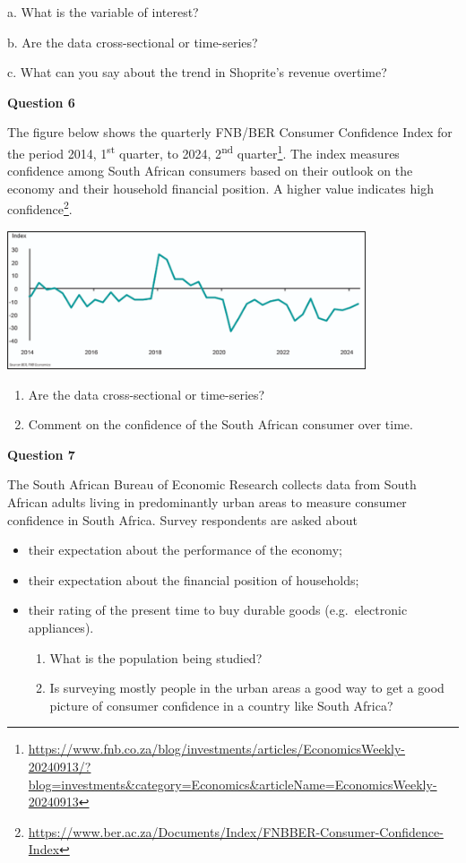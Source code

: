 \documentclass[
]{book}
\begin{document}
a. What is the variable of interest?

b. Are the data cross-sectional or time-series?

c. What can you say about the trend in Shoprite's revenue overtime?

\textbf{Question 6}

The figure below shows the quarterly FNB/BER Consumer Confidence Index for the period 2014, 1\textsuperscript{st} quarter, to 2024, 2\textsuperscript{nd} quarter\footnote{\url{https://www.fnb.co.za/blog/investments/articles/EconomicsWeekly-20240913/?blog=investments&category=Economics&articleName=EconomicsWeekly-20240913}}. The index measures confidence among South African consumers based on their outlook on the economy and their household financial position. A higher value indicates high confidence\footnote{\url{https://www.ber.ac.za/Documents/Index/FNBBER-Consumer-Confidence-Index}}.

\includegraphics[width=4.16667in,height=\textheight]{images/clipboard-2186963206.png}

\begin{enumerate}
\def\labelenumi{\alph{enumi}.}
\item
  Are the data cross-sectional or time-series?
\item
  Comment on the confidence of the South African consumer over time.
\end{enumerate}

\hfill\break
\textbf{Question 7}

The South African Bureau of Economic Research collects data from South African adults living in predominantly urban areas to measure consumer confidence in South Africa. Survey respondents are asked about

\begin{itemize}
\item
  their expectation about the performance of the economy;
\item
  their expectation about the financial position of households;
\item
  their rating of the present time to buy durable goods (e.g.~electronic appliances).

  \begin{enumerate}
  \def\labelenumi{\alph{enumi}.}
  \item
    What is the population being studied?
  \item
    Is surveying mostly people in the urban areas a good way to get a good picture of consumer confidence in a country like South Africa?
  \end{enumerate}
\end{itemize}
\end{document}
